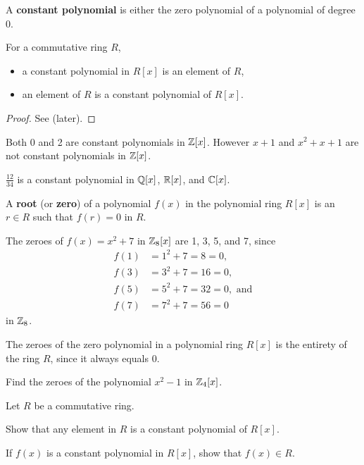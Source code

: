 \begin{definition}
    A \textbf{constant polynomial} is either the zero polynomial of a polynomial of degree 0.
\end{definition}
\begin{proposition}
    For a commutative ring $R$,
    \begin{itemize}
        \item a constant polynomial in $R[x]$ is an element of $R$,
        \item an element of $R$ is a constant polynomial of $R[x]$.
    \end{itemize}
\end{proposition}
\begin{proof}
    See  (later).
\end{proof}
\begin{example}
    Both 0 and 2 are constant polynomials in $\mathbb{Z}[x]$. However $x + 1$ and $x^2 + x + 1$ are not constant polynomials in $\mathbb{Z}[x]$.
\end{example}
\begin{example}
    $\frac{12}{34}$ is a constant polynomial in $\mathbb{Q}[x]$, $\mathbb{R}[x]$, and $\mathbb{C}[x]$.
\end{example}

\begin{definition}
    A \textbf{root} (or \textbf{zero}) of a polynomial $f(x)$ in the polynomial ring $R[x]$ is an $r \in R$ such that $f(r) = 0$ in $R$.
\end{definition}
\begin{example}
    The zeroes of $f(x) = x^2+7$ in $\mathbb{Z}_8[x]$ are 1, 3, 5, and 7, since
    \begin{align*}
        f(1) &= 1^2 + 7 = 8 = 0,\\
        f(3) &= 3^2 + 7 = 16 = 0,\\
        f(5) &= 5^2 + 7 = 32 = 0, \text{ and}\\
        f(7) &= 7^2 + 7 = 56 = 0
    \end{align*}
    in $\mathbb{Z}_8$.
\end{example}
\begin{example}
    The zeroes of the zero polynomial in a polynomial ring $R[x]$ is the entirety of the ring $R$, since it always equals 0.
\end{example}

\begin{exercise}
    Find the zeroes of the polynomial $x^2-1$ in $\mathbb{Z}_4[x]$.
\end{exercise}
\begin{exercise}\label{exercise-constant-polynomial-iff-ring-element}
    Let $R$ be a commutative ring.
    \begin{partquestions}{\alph*}
        \item Show that any element in $R$ is a constant polynomial of $R[x]$.
        \item If $f(x)$ is a constant polynomial in $R[x]$, show that $f(x) \in R$.
    \end{partquestions}
\end{exercise}

